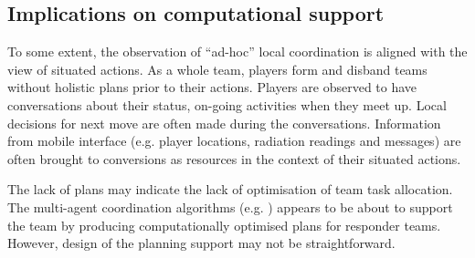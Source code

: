 
\subsection{Implications on computational support}

To some extent, the observation of ``ad-hoc'' local coordination is aligned with the view of situated actions. As a whole team, players form and disband teams without holistic plans prior to their actions. Players are observed to have conversations about their status, on-going activities when they meet up. Local decisions for next move are often made during the conversations.  Information from mobile interface (e.g. player locations, radiation readings and messages) are often brought to conversions as resources in the context of their situated actions. 

The lack of plans may indicate the lack of optimisation of team task allocation. The multi-agent coordination algorithms (e.g. \cite{Ramchurn2010}) appears to be about to support the team by producing computationally optimised plans for responder teams. However, design of the planning support may not be straightforward. \\

